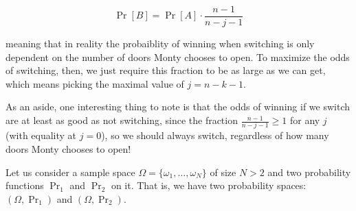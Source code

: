\documentclass[11pt]{article}
\begin{document}
\begin{Parts}
\begin{solution}
            \[\Pr[B] =  \Pr[A] \cdot \frac{n-1}{n - j - 1}\]

            meaning that in reality the probaiblity of winning when switching is only dependent on the number of doors Monty chooses to open. To maximize the odds of switching, then, we just require this fraction to be as large as we can get, which means picking the maximal value of $j = n - k - 1$.
               
            As an aside, one interesting thing to note is that the odds of winning if we switch are at least as good as not switching, since the fraction $\frac{n - 1}{n - j - 1} \ge 1$ for any $j$ (with equality at $j = 0$), so we should always switch, regardless of how many doors Monty chooses to open!


        \end{solution}
\end{Parts}
\pagebreak
{}

Let us consider a sample space $\Omega = \{\omega_1, \dots, \omega_N\}$ of size $N>2$ and two probability functions $\Pr_1$ and $\Pr_2$ on it. That is, we have two probability spaces: $(\Omega, \Pr_1)$ and $(\Omega, \Pr_2)$.
\end{document}
